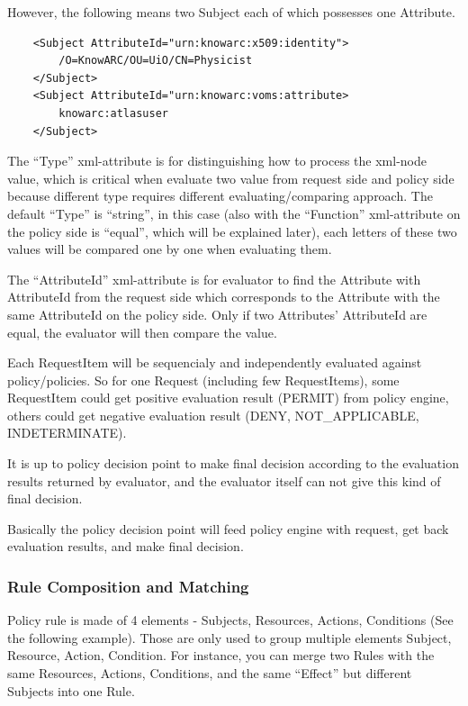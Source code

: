 \documentclass{article}                            %
\begin{document}
However, the following means two Subject each of which possesses one Attribute.

\begin{verbatim}
    <Subject AttributeId="urn:knowarc:x509:identity">
        /O=KnowARC/OU=UiO/CN=Physicist
    </Subject>
    <Subject AttributeId="urn:knowarc:voms:attribute>
        knowarc:atlasuser
    </Subject>
\end{verbatim}

The ``Type'' xml-attribute is for distinguishing how to process the xml-node value, which is critical when evaluate two value from request side and policy side because different type requires different evaluating/comparing approach. The default ``Type'' is ``string'', in this case (also with the ``Function'' xml-attribute on the policy side is ``equal'', which will be explained later), each letters of these two values will be compared one by one when evaluating them.

The ``AttributeId'' xml-attribute is for evaluator to find the Attribute with AttributeId from the request side which corresponds to the Attribute with the same AttributeId on the policy side. Only if two Attributes' AttributeId are equal, the evaluator will then compare the value.

Each RequestItem will be sequencialy and independently evaluated against policy/policies. So for one Request (including few RequestItems), some RequestItem could get positive evaluation result (PERMIT) from policy engine, others could get negative evaluation result (DENY, NOT\_APPLICABLE, INDETERMINATE).

It is up to policy decision point to make final decision according to the evaluation results returned by evaluator, and the evaluator itself can not give this kind of final decision.

Basically the policy decision point will feed policy engine with request, get back evaluation results,
and make final decision.


\subsubsection{Rule Composition and Matching} %
\label{subsubsec:rule_comp_match}

Policy rule is made of 4 elements - Subjects, Resources, Actions, Conditions (See the following example). Those are only used to group multiple elements Subject, Resource, Action, Condition. For instance, you can merge two Rules with the same Resources, Actions, Conditions, and the same ``Effect'' but different Subjects into one Rule.
\end{document}
